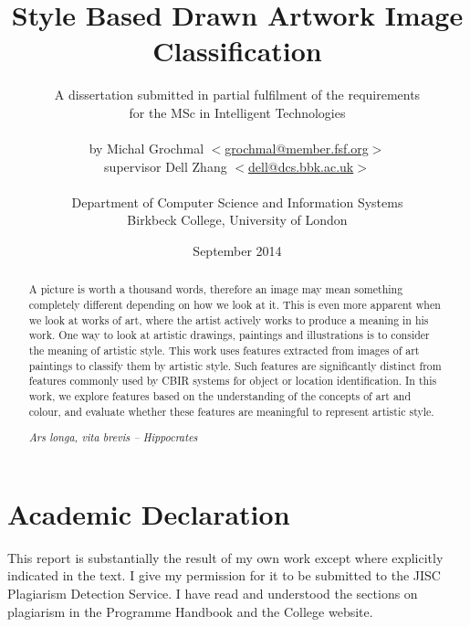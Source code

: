 \documentclass[11pt,a4paper,twoside,openright]{report}
\title{Style Based Drawn Artwork Image Classification}
\author{A dissertation submitted in partial fulfilment of the requirements\\
  for the MSc in Intelligent Technologies\\
  \\
  by Michal Grochmal
  $<$\href{mailto:grochmal@member.fsf.org}{grochmal@member.fsf.org}$>$\\
  supervisor Dell Zhang
  $<$\href{mailto:dell@dcs.bbk.ac.uk}{dell@dcs.bbk.ac.uk}$>$\\
  \\
  Department of Computer Science and Information Systems\\
  Birkbeck College, University of London
}
\date{September 2014}
\begin{document}
\VerbatimFootnotes
\maketitle

\newpage
\null
\thispagestyle{empty}
\newpage

\pagestyle{fancy}
\lhead{}
\rhead{}

\begin{abstract}

A picture is worth a thousand words, therefore an image may mean something
completely different depending on how we look at it.  This is even more
apparent when we look at works of art, where the artist actively works to
produce a meaning in his work.  One way to look at artistic drawings, paintings
and illustrations is to consider the meaning of artistic style.  This work uses
features extracted from images of art paintings to classify them by artistic
style.  Such features are significantly distinct from features commonly used by
CBIR systems for object or location identification.  In this work, we explore
features based on the understanding of the concepts of art and colour, and
evaluate whether these features are meaningful to represent artistic style.

\begin{flushright}
\emph{Ars longa, vita brevis -- Hippocrates}
\end{flushright}
\end{abstract}

\newpage
\null
\thispagestyle{empty}
\newpage

\newpage
{}
{}
\setcounter{page}{1}
\tableofcontents

\newpage
{}
{}
\listoffigures

\newpage
\null
\thispagestyle{empty}
\newpage

\newpage
{}
{}
\listoftables

\newpage
\null
\thispagestyle{empty}
\newpage

\newpage
{}
{}
\chapter*{Academic Declaration}
This report is substantially the result of my own work except where explicitly
indicated in the text.  I give my permission for it to be submitted to the JISC
Plagiarism Detection Service.  I have read and understood the sections on
plagiarism in the Programme Handbook and the College website.
\end{document}
